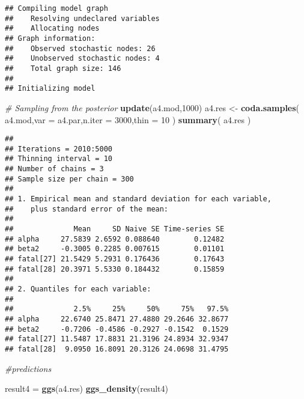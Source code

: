 \documentclass[]{article}
\newenvironment{Shaded}{\begin{snugshade}}{\end{snugshade}}
\newcommand{\KeywordTok}[1]{\textcolor[rgb]{0.13,0.29,0.53}{\textbf{#1}}}
\newcommand{\DataTypeTok}[1]{\textcolor[rgb]{0.13,0.29,0.53}{#1}}
\newcommand{\DecValTok}[1]{\textcolor[rgb]{0.00,0.00,0.81}{#1}}
\newcommand{\StringTok}[1]{\textcolor[rgb]{0.31,0.60,0.02}{#1}}
\newcommand{\CommentTok}[1]{\textcolor[rgb]{0.56,0.35,0.01}{\textit{#1}}}
\newcommand{\NormalTok}[1]{#1}
\begin{document}
\begin{verbatim}
## Compiling model graph
##    Resolving undeclared variables
##    Allocating nodes
## Graph information:
##    Observed stochastic nodes: 26
##    Unobserved stochastic nodes: 4
##    Total graph size: 146
## 
## Initializing model
\end{verbatim}

\begin{Shaded}
\begin{Highlighting}[]
 \CommentTok{# Sampling from the posterior}
 \KeywordTok{update}\NormalTok{(a4.mod,}\DecValTok{1000}\NormalTok{)}
\NormalTok{ a4.res <-}\StringTok{ }\KeywordTok{coda.samples}\NormalTok{( a4.mod,}\DataTypeTok{var =}\NormalTok{ a4.par,}\DataTypeTok{n.iter =} \DecValTok{3000}\NormalTok{,}\DataTypeTok{thin =} \DecValTok{10}\NormalTok{ )}
 \KeywordTok{summary}\NormalTok{( a4.res )}
\end{Highlighting}
\end{Shaded}

\begin{verbatim}
## 
## Iterations = 2010:5000
## Thinning interval = 10 
## Number of chains = 3 
## Sample size per chain = 300 
## 
## 1. Empirical mean and standard deviation for each variable,
##    plus standard error of the mean:
## 
##              Mean     SD Naive SE Time-series SE
## alpha     27.5839 2.6592 0.088640        0.12482
## beta2     -0.3005 0.2285 0.007615        0.01101
## fatal[27] 21.5429 5.2931 0.176436        0.17643
## fatal[28] 20.3971 5.5330 0.184432        0.15859
## 
## 2. Quantiles for each variable:
## 
##              2.5%     25%     50%     75%   97.5%
## alpha     22.6740 25.8471 27.4880 29.2646 32.8677
## beta2     -0.7206 -0.4586 -0.2927 -0.1542  0.1529
## fatal[27] 11.5487 17.8831 21.3196 24.8934 32.9347
## fatal[28]  9.0950 16.8091 20.3126 24.0698 31.4795
\end{verbatim}

\begin{Shaded}
\begin{Highlighting}[]
 \CommentTok{#predictions}
\end{Highlighting}
\end{Shaded}

\begin{Shaded}
\begin{Highlighting}[]
\NormalTok{result4 =}\StringTok{ }\KeywordTok{ggs}\NormalTok{(a4.res)}
\KeywordTok{ggs_density}\NormalTok{(result4)}
\end{Highlighting}
\end{Shaded}
\end{document}
